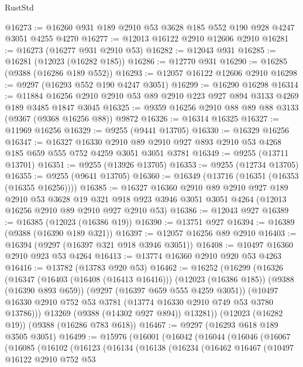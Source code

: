 \begin{lexlean}{RustStd}
\begin{coremodule}
@16273 := @16260 @931 @189 @2910 @53 @3628 @185 @552 @190 @928 @4247 @3051 @4255 @4270
@16277 := @12013 @16122 @2910 @12606 @2910
@16281 := @16273 (@16277 @931 @2910 @53)
@16282 := @12043 @931
@16285 := @16281 (@12023 (@16282 @185))
@16286 := @12770 @931
@16290 := @16285 (@9388 (@16286 @189 @552))
@16293 := @12057 @16122 @12606 @2910
@16298 := @9297 (@16293 @552 @190 @4247 @3051)
@16299 := @16290 @16298
@16314 := @11884 @16256 @2910 @2910 @53 @89 @2910 @223 @927 @894 @3133 @4269 @189 @3485 @1847 @3045
@16325 := @9359 @16256 @2910 @88 @89 @88 @3133 (@9367 (@9368 @16256 @88)) @9872
@16326 := @16314 @16325
@16327 := @11969 @16256
@16329 := @9255 (@9441 @13705)
@16330 := @16329 @16256
@16347 := @16327
    @16330
    @2910
    @89
    @2910
    @927
    @893
    @2910
    @53
    @4268
    @185
    @659
    @555
    @752
    @4259
    @3051
    @3051
    @3781
@16349 := @9255 (@13711 @13701)
@16351 := @9255 (@13926 @13705)
@16353 := @9255 (@12734 @13705)
@16355 := @9255 (@9641 @13705)
@16360 := @16349 (@13716 (@16351 (@16353 (@16355 @16256))))
@16385 := @16327
    @16360
    @2910
    @89
    @2910
    @927
    @189
    @2910
    @53
    @3628
    @19
    @321
    @918
    @923
    @3946
    @3051
    @3051
    @4264
    (@12013 @16256 @2910 @89 @2910 @927 @2910 @53)
@16386 := @12043 @927
@16389 := @16385 (@12023 (@16386 @19))
@16390 := @13751 @927
@16394 := @16389 (@9388 (@16390 @189 @321))
@16397 := @12057 @16256 @89 @2910
@16403 := @16394 (@9297 (@16397 @321 @918 @3946 @3051))
@16408 := @10497 @16360 @2910 @923 @53 @4264
@16413 := @13774 @16360 @2910 @920 @53 @4263
@16416 := @13782 (@13783 @920 @53)
@16462 := @16252
    (@16299
      (@16326
        (@16347
          (@16403 (@16408 (@16413 @16416)))
          (@12023 (@16386 @185))
          (@9388 (@16390 @893 @659))
          (@9297 (@16397 @659 @555 @4259 @3051))
          (@10497 @16330 @2910 @752 @53 @3781 (@13774 @16330 @2910 @749 @53 @3780 @13786)))
        @13269
        (@9388 (@14302 @927 @894))
        @13281))
    (@12023 (@16282 @19))
    (@9388 (@16286 @783 @618))
@16467 := @9297 (@16293 @618 @189 @3505 @3051)
@16499 := @15976
    (@16001
      (@16042
        (@16044
          (@16046
            (@16067
              (@16085
                (@16102
                  (@16123
                    (@16134
                      (@16138
                        (@16234
                          (@16462
                            @16467
                            (@10497
                              @16122
                              @2910
                              @752
                              @53

\end{coremodule}
\end{lexlean}
